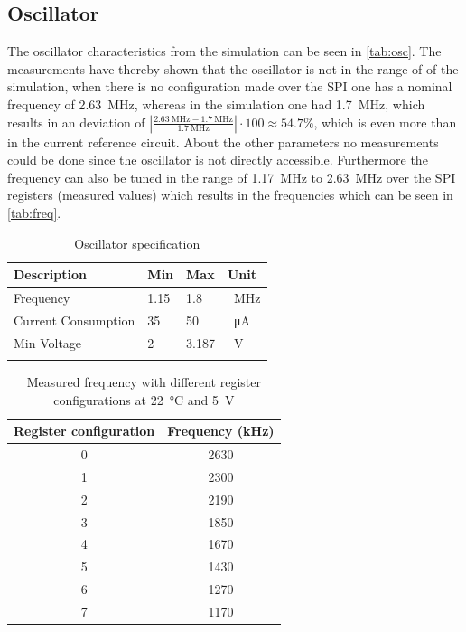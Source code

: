 \subsection{Oscillator}
\label{subsubsec:oscillator}
The oscillator characteristics from the simulation can be seen in \autoref{tab:osc}. The measurements have thereby shown that the oscillator is not in the range of of the simulation, when there is no configuration made over the SPI one has a nominal frequency of \qty{2.63}{\mega\hertz}, whereas in the simulation one had \qty{1.7}{\mega\hertz}, which results in an deviation of $\left|\frac{\qty{2.63}{\mega\hertz}-\qty{1.7}{\mega\hertz}}{\qty{1.7}{\mega\hertz}}\right|\cdot 100\approx 54.7 \%$, which is even more than in the current reference circuit. About the other parameters no measurements could be done since the oscillator is not directly accessible. Furthermore the frequency can also be tuned in the range of \qty{1.17}{\mega\hertz} to \qty{2.63}{\mega\hertz} over the SPI registers (measured values) which results in the frequencies which can be seen in \autoref{tab:freq}. 
\begin{longtable}{|p{5cm}|p{2.5cm}|p{2.5cm}|p{2.5cm}|}
	\hline
	\rowcolor{lightgray}
	\textbf{Description} &\textbf{Min} &\textbf{Max} & \textbf{Unit} \\ \hline
	
	Frequency & 1.15 & 1.8 &\qty{}{\mega\hertz} \\ \hline
	Current Consumption & 35 & 50 & \qty{}{\micro\ampere} \\ \hline
	Min Voltage & 2& 3.187 & \qty{}{\volt} \\ \hline
	\caption{Oscillator specification} %
	\label{tab:osc}
\end{longtable}
\begin{table}[h]
	\centering
	\begin{tabular}{|c|c|}
		\hline
		\rowcolor{lightgray}
		\textbf{Register configuration} & \textbf{Frequency (kHz)} \\
		\hline
		0 & \qty{2630}{} \\
		\hline
		1 & \qty{2300}{} \\
		\hline
		2 & \qty{2190}{}\\
		\hline
		3 & \qty{1850}{} \\
		\hline
		4 & \qty{1670}{} \\
		\hline
		5 & \qty{1430}{}\\
		\hline
		6 & \qty{1270}{} \\
		\hline
		7 & \qty{1170}{}\\
		\hline
	\end{tabular}
	\caption{Measured frequency with different register configurations at \qty{22}{\degreeCelsius} and \qty{5}{\volt}}
	\label{tab:freq}
\end{table}


